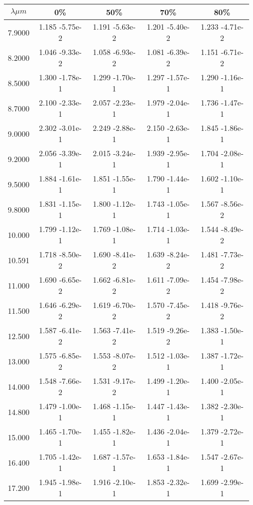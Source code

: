 \documentclass[12pt]{article}
\begin{document}
\begin{center}
\begin{table}
\begin{tabular}{| c | c | c | c | c |  }
\hline
 $\lambda \mu m$ & 0\%  & 50\%  & 70\%  &  80\%  \\
\hline 
7.9000 &   1.185 -5.75e-2  &  1.191 -5.63e-2 &   1.201 -5.40e-2  &  1.233 -4.71e-2  \\ 
8.2000 &   1.046 -9.33e-2  &  1.058 -6.93e-2  &  1.081 -6.39e-2  &  1.151 -6.71e-2  \\ 
8.5000 &   1.300 -1.78e-1 &   1.299 -1.70e-1  &  1.297 -1.57e-1  &  1.290 -1.16e-1  \\ 
8.7000 &   2.100 -2.33e-1  &  2.057 -2.23e-1  &  1.979 -2.04e-1  &  1.736 -1.47e-1   \\
9.0000 &   2.302 -3.01e-1  &  2.249 -2.88e-1  &  2.150 -2.63e-1  &  1.845 -1.86e-1  \\
9.2000 &   2.056 -3.39e-1  &  2.015 -3.24e-1  &  1.939 -2.95e-1  &  1.704 -2.08e-1   \\
9.5000 &   1.884 -1.61e-1  &  1.851 -1.55e-1  &  1.790 -1.44e-1  &  1.602 -1.10e-1   \\
9.8000 &   1.831 -1.15e-1  &  1.800 -1.12e-1  &  1.743 -1.05e-1  &  1.567 -8.56e-2  \\ 
10.000 &   1.799 -1.12e-1  &  1.769 -1.08e-1  &  1.714 -1.03e-1  &  1.544 -8.49e-2   \\ 
10.591 &   1.718 -8.50e-2  &  1.690 -8.41e-2  &  1.639 -8.24e-2  &  1.481 -7.73e-2  \\
11.000  &  1.690 -6.65e-2  &  1.662 -6.81e-2 &   1.611 -7.09e-2  &  1.454 -7.98e-2  \\
11.500 &   1.646 -6.29e-2 &   1.619 -6.70e-2  &  1.570 -7.45e-2 &   1.418 -9.76e-2   \\
12.500 &   1.587 -6.41e-2 &   1.563 -7.41e-2 &   1.519 -9.26e-2 &   1.383 -1.50e-1   \\
13.000 &   1.575 -6.85e-2 &   1.553 -8.07e-2  &  1.512 -1.03e-1  &  1.387 -1.72e-1   \\
14.000 &   1.548 -7.66e-2 &   1.531 -9.17e-2  &  1.499 -1.20e-1  &  1.400 -2.05e-1   \\
14.800 &   1.479 -1.00e-1 &   1.468 -1.15e-1  &  1.447 -1.43e-1 &   1.382 -2.30e-1   \\
15.000 &   1.465 -1.70e-1 &   1.455 -1.82e-1 &   1.436 -2.04e-1  &  1.379 -2.72e-1   \\
16.400 &   1.705 -1.42e-1  &  1.687 -1.57e-1 &   1.653 -1.84e-1  &  1.547 -2.67e-1   \\
17.200 &   1.945 -1.98e-1  &  1.916 -2.10e-1  &  1.853 -2.32e-1  &  1.699 -2.99e-1   \\

\end{tabular}
\end{table}
\end{center}
\end{document}
